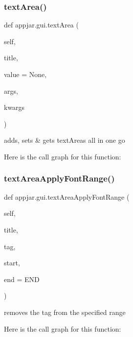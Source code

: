 \begin{DoxyVerb}
\subsubsection{\texorpdfstring{text\+Area()}{textArea()}}
{\footnotesize\ttfamily def appjar.\+gui.\+text\+Area (\begin{DoxyParamCaption}\item[{}]{self,  }\item[{}]{title,  }\item[{}]{value = {\ttfamily None},  }\item[{}]{args,  }\item[{}]{kwargs }\end{DoxyParamCaption})}

\begin{DoxyVerb}adds, sets & gets textAreas all in one go \end{DoxyVerb}
 Here is the call graph for this function\+:
\mbox{\label{classappjar_1_1gui_afd3aa54cb1b88d3632114e2e5390f9a5}} 
\subsubsection{\texorpdfstring{text\+Area\+Apply\+Font\+Range()}{textAreaApplyFontRange()}}
{\footnotesize\ttfamily def appjar.\+gui.\+text\+Area\+Apply\+Font\+Range (\begin{DoxyParamCaption}\item[{}]{self,  }\item[{}]{title,  }\item[{}]{tag,  }\item[{}]{start,  }\item[{}]{end = {\ttfamily END} }\end{DoxyParamCaption})}

\begin{DoxyVerb}removes the tag from the specified range \end{DoxyVerb}
 Here is the call graph for this function\+:
\mbox{\label{classappjar_1_1gui_a645bdedd950ff615de7b94a4f2147c67}} 

\end{DoxyVerb}

